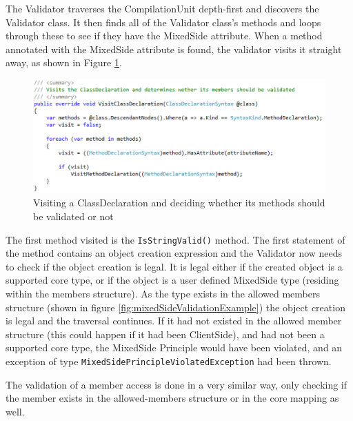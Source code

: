 		The Validator traverses the CompilationUnit depth-first and discovers the Validator class. It then finds all of the Validator class's methods and loops through these to see if they have the MixedSide attribute. When a method annotated with the MixedSide attribute is found, the validator visits it straight away, as shown in Figure \ref{fig:ValidatorVisitClassDeclaration}. 

		\begin{figure}[H]
			\begin{center}
				\centerline{\includegraphics[width=14cm]{resources/images/ValidatorVisitClassDeclaration.png}}
			\end{center}
			\caption{Visiting a ClassDeclaration and deciding whether its methods should be validated or not}
			\label{fig:ValidatorVisitClassDeclaration}
		\end{figure}

		The first method visited is the \texttt{IsStringValid()} method. The first statement of the method contains an object creation expression and the Validator now needs to check if the object creation is legal. It is legal either if the created object is a supported core type, or if the object is a user defined MixedSide type (residing within the members structure). As the type exists in the allowed members structure (shown in figure \ref{fig:mixedSideValidationExample}) the object creation is legal and the traversal continues. If it had not existed in the allowed member structure (this could happen if it had been ClientSide), and had not been a supported core type, the MixedSide Principle would have been violated, and an exception of type \texttt{MixedSidePrincipleViolatedException} had been thrown.

		The validation of a member access is done in a very similar way, only checking if the member exists in the allowed-members structure or in the core mapping as well.










	
